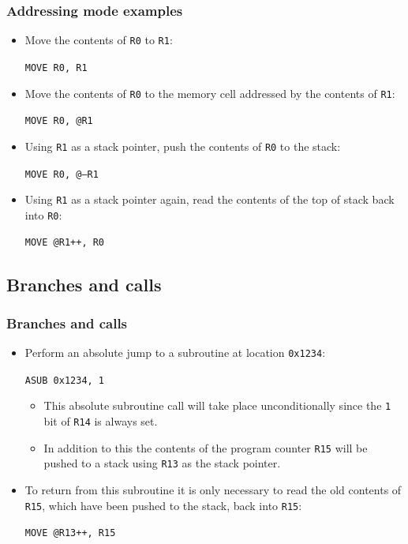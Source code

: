 \documentclass{beamer}
\begin{document}
%
   \begin{frame}
    \frametitle{Addressing mode examples}
    \begin{itemize}
     \item Move the contents of {\tt R0} to {\tt R1}:
      \begin{center}
       {\tt MOVE R0, R1}
      \end{center}
     \item Move the contents of {\tt R0} to the memory cell addressed by the
      contents of {\tt R1}:
      \begin{center}
       {\tt MOVE R0, @R1}
      \end{center}
     \item Using {\tt R1} as a stack pointer, push the contents of {\tt R0}
      to the stack:
      \begin{center}
       {\tt MOVE R0, @--R1}
      \end{center}
     \item Using {\tt R1} as a stack pointer again, read the contents of the 
      top of stack back into {\tt R0}:
      \begin{center}
       {\tt MOVE @R1++, R0}
      \end{center}
    \end{itemize}
   \end{frame}
%
  \subsection{Branches and calls}
   \begin{frame}
    \frametitle{Branches and calls}
    \begin{itemize}
     \item Perform an absolute jump to a subroutine at location {\tt 0x1234}:
      \begin{center}
       {\tt ASUB 0x1234, 1}
      \end{center}
      \begin{itemize}
       \item This absolute subroutine call will take place unconditionally 
        since the {\tt 1} bit of {\tt R14} is always set. 
       \item In addition to this the contents of the program counter
        {\tt R15} will be pushed to a stack using {\tt R13} as the stack
        pointer.
      \end{itemize}
     \item To return from this subroutine it is only necessary to read the
      old contents of {\tt R15}, which have been pushed to the stack, back
      into {\tt R15}:
      \begin{center}
       {\tt MOVE @R13++, R15}
      \end{center}
    \end{itemize}
   \end{frame}
%
\end{document}
